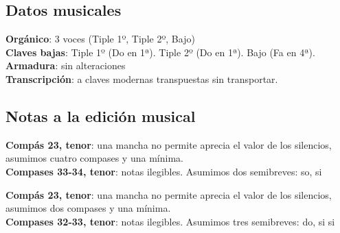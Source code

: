 \subsection*{Datos musicales}
\noindent \textbf{Orgánico}: 3 voces (Tiple 1º, Tiple 2º, Bajo)\\
\textbf{Claves bajas}: Tiple 1º (Do en 1ª). Tiple 2º (Do en 1ª). Bajo (Fa en 4ª).\\
\textbf{Armadura}: sin alteraciones\\
\textbf{Transcripción}: a claves modernas transpuestas sin transportar.

\subsection*{Notas a la edición musical}

\noindent \textbf{Compás 23, tenor}: una mancha no permite aprecia el valor de los silencios, asumimos cuatro compases y una mínima.\\
\textbf{Compases 33-34, tenor}: notas ilegibles. Asumimos dos semibreves: so, si


\noindent \textbf{Compás 23, tenor}: una mancha no permite aprecia el valor de los silencios, asumimos dos compases y una mínima.\\
\textbf{Compases 32-33, tenor}: notas ilegibles. Asumimos tres semibreves: do, si si

